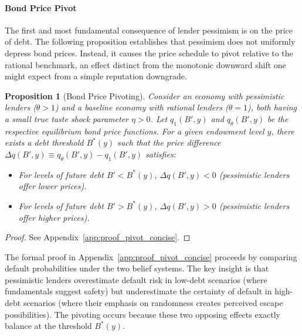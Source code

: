 \documentclass[12pt]{article}
\theoremstyle{plain}
\newtheorem{proposition}{Proposition}
\begin{document}
\paragraph{Bond Price Pivot}The first and most fundamental consequence of lender pessimism is on the price
of debt. The following proposition establishes that pessimism does not
uniformly depress bond prices. Instead, it causes the price schedule to pivot
relative to the rational benchmark, an effect distinct from the monotonic
downward shift one might expect from a simple reputation downgrade.

\begin{proposition}[Bond Price Pivoting]\label{prop:pivot_concise}
	Consider an economy with pessimistic lenders ($\theta > 1$) and a baseline economy with rational lenders ($\theta = 1$), both having a small true taste shock parameter $\eta > 0$. Let $q_1(B', y)$ and $q_\theta(B', y)$ be the respective equilibrium bond price functions. For a given endowment level $y$, there exists a debt threshold $B^*(y)$ such that the price difference $\Delta q(B', y) \equiv q_\theta(B', y) - q_1(B', y)$ satisfies:
	\begin{itemize}
		\item For levels of future debt $B' < B^*(y)$, $\Delta q(B', y) < 0$ (pessimistic
		      lenders offer lower prices).
		\item For levels of future debt $B' > B^*(y)$, $\Delta q(B', y) > 0$ (pessimistic
		      lenders offer higher prices).
	\end{itemize}
\end{proposition}

\begin{proof}
	See Appendix~\ref{app:proof_pivot_concise}.
\end{proof}

The formal proof in Appendix~\ref{app:proof_pivot_concise} proceeds by
comparing default probabilities under the two belief systems. The key insight
is that pessimistic lenders overestimate default risk in low-debt scenarios
(where fundamentals suggest safety) but underestimate the certainty of default
in high-debt scenarios (where their emphasis on randomness creates perceived
escape possibilities). The pivoting occurs because these two opposing effects
exactly balance at the threshold $B^*(y)$.
\end{document}
